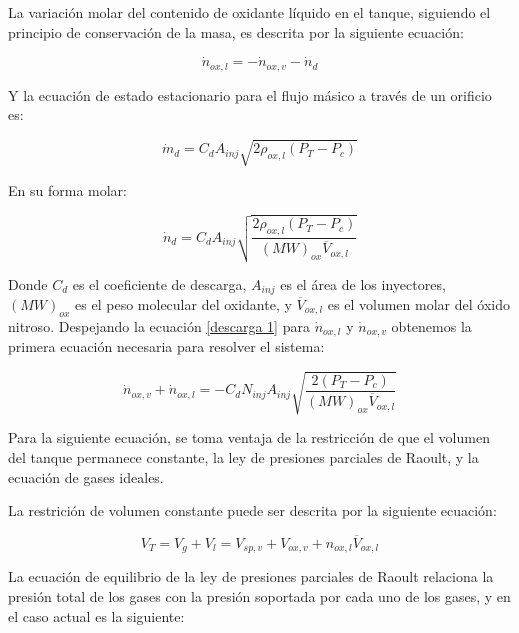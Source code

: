\documentclass[12pt]{article}
\begin{document}
La variación molar del contenido de oxidante líquido en el tanque, siguiendo el principio de conservación de la masa, es descrita por la siguiente ecuación:

\begin{equation}
    \dot{n}_{ox,l} = -\dot{n}_{ox,v} - \dot{n}_{d}
    \label{descarga 1}
\end{equation}

Y la ecuación de estado estacionario para el flujo másico a través de un orificio es:

\begin{equation}
    \dot{m}_{d} = C_{d} A_{inj} \sqrt{2\rho_{ox,l}(P_{T} - P_{c})}
\end{equation}

En su forma molar:

\begin{equation}
    \dot{n}_{d} = C_{d} A_{inj} \sqrt{ \frac{ 2\rho_{ox,l}(P_{T} - P_{c}) }{ (MW)_{ox} \overline{V}_{ox,l} } }
    \label{descarga 2}
\end{equation}

Donde $C_{d}$ es el coeficiente de descarga, $A_{inj}$ es el área de los inyectores, $(MW)_{ox}$ es el peso molecular del oxidante, y $\overline{V}_{ox,l}$ es el volumen molar del óxido nitroso. Despejando la ecuación \ref{descarga 1} para $\dot{n}_{ox,l}$ y $\dot{n}_{ox,v}$ obtenemos la primera ecuación necesaria para resolver el sistema:

\begin{equation}
    \dot{n}_{ox,v} + \dot{n}_{ox,l} = -C_{d}N_{inj}A_{inj}\sqrt{\frac{2(P_{T}-P_{c})}{(MW)_{ox}\overline{V}_{ox,l}}}
    \label{ox 1}
\end{equation}

Para la siguiente ecuación, se toma ventaja de la restricción de que el volumen del tanque permanece constante, la ley de presiones parciales de Raoult, y la ecuación de gases ideales.

La restrición de volumen constante puede ser descrita por la siguiente ecuación:

\begin{equation}
    V_{T} = V_{g} + V_{l} = V_{sp,v} + V_{ox,v} + n_{ox,l} \overline{V}_{ox,l}
    \label{volumen}
\end{equation}

La ecuación de equilibrio de la ley de presiones parciales de Raoult relaciona la presión total de los gases con la presión soportada por cada uno de los gases, y en el caso actual es la siguiente:
\end{document}
